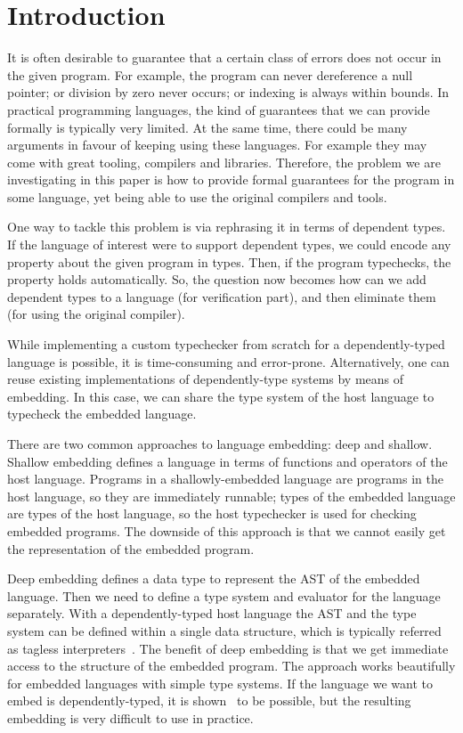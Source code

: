 \documentclass[sigplan,anonymous,review]{acmart}
\begin{document}
\section{Introduction}



It is often desirable to guarantee that a certain class of errors does
not occur in the given program.  For example, the program can never dereference
a null pointer; or division by zero never occurs; or indexing is always
within bounds.  In practical programming languages, the kind of guarantees
that we can provide formally is typically very limited.  At the same time,
there could be many arguments in favour of keeping using these languages.
For example they may come with great tooling, compilers and libraries.
Therefore, the problem we are investigating in this paper is how to
provide formal guarantees for the program in some language, yet being
able to use the original compilers and tools.

One way to tackle this problem is via rephrasing it in terms
of dependent types.  If the language of interest were to support dependent
types, we could encode any property about the given program in
types.  Then, if the program typechecks, the property holds automatically.
So, the question now becomes how can we add dependent types to a language
(for verification part), and then eliminate them (for using the original
compiler).

While implementing a custom typechecker from scratch for a
dependently-typed language is possible, it is time-consuming and error-prone.
Alternatively, one can reuse existing implementations of dependently-type
systems by means of embedding.  In this case, we can share the type system
of the host language to typecheck the embedded language.

There are two common approaches to language embedding: deep and shallow.
Shallow embedding defines a language in terms of functions and operators
of the host language.  Programs in a shallowly-embedded language are programs
in the host language, so they are immediately runnable; types of the embedded
language are types of the host language, so the host typechecker is used for
checking embedded programs.  The downside of this approach is that we cannot
easily get the representation of the embedded program.

Deep embedding defines a data type to represent the AST of the embedded language.
Then we need to define a type system and evaluator for the language separately.
With a dependently-typed host language the AST and the type system can be
defined within a single data structure, which is typically referred as
tagless interpreters~\cite{}.  The benefit of deep embedding is that we
get immediate access to the structure of the embedded program.
The approach works beautifully for
embedded languages with simple type systems.  If the language we want to
embed is dependently-typed, it is shown~\cite{} to be possible, but the
resulting embedding is very difficult to use in practice.
\end{document}
